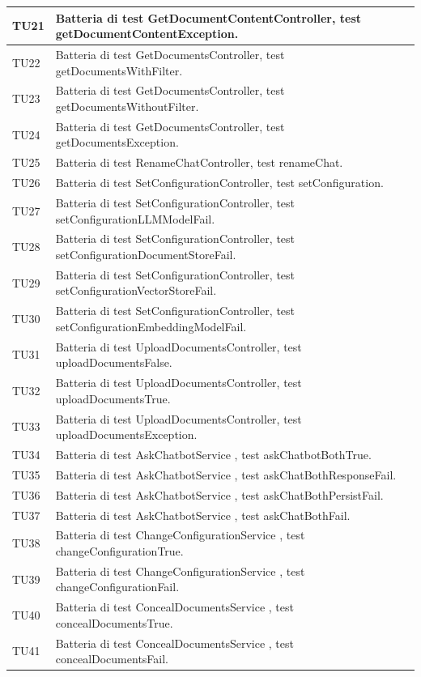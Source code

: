 \documentclass[10pt, a4paper]{article}
\begin{document}
\begin{xltabular}{\textwidth}{p{0.12\textwidth}|X}
\hline
TU21 & Batteria di test GetDocumentContentController, test getDocumentContentException. \\
\hline
TU22 & Batteria di test GetDocumentsController, test getDocumentsWithFilter. \\
\hline
TU23 & Batteria di test GetDocumentsController, test getDocumentsWithoutFilter. \\
\hline
TU24 & Batteria di test GetDocumentsController, test getDocumentsException. \\
\hline
TU25 & Batteria di test RenameChatController, test renameChat. \\
\hline
TU26 & Batteria di test SetConfigurationController, test setConfiguration. \\
\hline
TU27 & Batteria di test SetConfigurationController, test setConfigurationLLMModelFail. \\
\hline
TU28 & Batteria di test SetConfigurationController, test setConfigurationDocumentStoreFail. \\
\hline
TU29 & Batteria di test SetConfigurationController, test setConfigurationVectorStoreFail. \\
\hline
TU30 & Batteria di test SetConfigurationController, test setConfigurationEmbeddingModelFail. \\
\hline
TU31 & Batteria di test UploadDocumentsController, test uploadDocumentsFalse. \\
\hline
TU32 & Batteria di test UploadDocumentsController, test uploadDocumentsTrue. \\
\hline
TU33 & Batteria di test UploadDocumentsController, test uploadDocumentsException. \\
\hline
TU34 & Batteria di test AskChatbotService , test askChatbotBothTrue. \\
\hline
TU35 & Batteria di test AskChatbotService , test askChatBothResponseFail. \\
\hline
TU36 & Batteria di test AskChatbotService , test askChatBothPersistFail. \\
\hline
TU37 & Batteria di test AskChatbotService , test askChatBothFail. \\
\hline
TU38 & Batteria di test ChangeConfigurationService , test changeConfigurationTrue. \\
\hline
TU39 & Batteria di test ChangeConfigurationService , test changeConfigurationFail. \\
\hline
TU40 & Batteria di test ConcealDocumentsService , test concealDocumentsTrue. \\
\hline
TU41 & Batteria di test ConcealDocumentsService , test concealDocumentsFail. \\

\end{xltabular}
\end{document}
